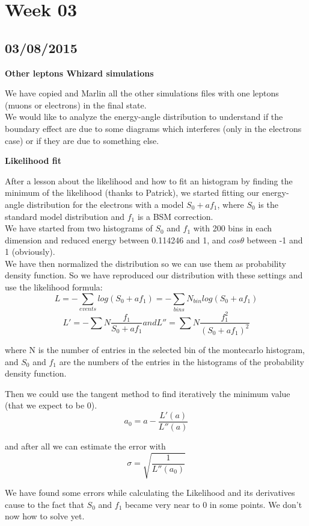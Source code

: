 \section{Week 03}

\subsection{03/08/2015}

\textbf{Other leptons Whizard simulations}

We have copied and Marlin all the other simulations files with one leptons (muons or electrons) in the final state.\\
We would like to analyze the energy-angle distribution to understand if the boundary effect are due to some diagrams which interferes (only in the electrons case) or if they are due to something else.

\textbf{Likelihood fit}

After a lesson about the likelihood and how to fit an histogram by finding the minimum of the likelihood (thanks to Patrick), we started fitting our energy-angle distribution for the electrons with a model $S_0 + a f_1$, where $S_0$ is the standard model distribution and $f_1$ is a BSM correction.\\

We have started from two histograms of $S_0$ and $f_1$ with 200 bins in each dimension and reduced energy between 0.114246 and 1, and $cos\theta$ between -1 and 1 (obviously).\\ We have then normalized the distribution so we can use them as probability density function. So we have reproduced our distribution with these settings and use the likelihood formula:
\[L=-\sum_{events} log(S_0+a f_1) = -\sum_{bins} N_{bin} log(S_0+a f_1)\]
\[L'=-\sum N \frac{f_1}{S_0 + a f_1}  and  L''= \sum N \frac{f_1^2}{(S_0 + a f_1)^2}\]

where N is the number of entries in the selected bin of the montecarlo histogram, and $S_0$ and $f_1$ are the numbers of the entries in the histograms of the probability density function.

Then we could use the tangent method to find iteratively the minimum value (that we expect to be 0).
\[a_0 = a - \frac{L'(a)}{L''(a)}\]

and after all we can estimate the error with \[\sigma = \sqrt{\frac{1}{L''(a_0)}}\]

We have found some errors while calculating the Likelihood and its derivatives cause to the fact that $S_0$ and $f_1$ became very near to 0 in some points. We don't now how to solve yet.

